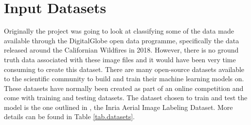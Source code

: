 \chapter{Input Datasets}
Originally the project was going to look at classifying some of the data made available through the DigitalGlobe open data programme, specifically the data released around the Californian Wildfires in 2018. However, there is no ground truth data associated with these image files and it would have been very time consuming to create this dataset. There are many open-source datasets available to the scientific community to build and train their machine learning models on. These datasets have normally been created as part of an online competition and come with training and testing datasets. The dataset chosen to train and test the model is the one outlined in \cite{maggiori17a}, the Inria Aerial Image Labeling Dataset. More details can be found in Table \ref{tab.datasets}.
